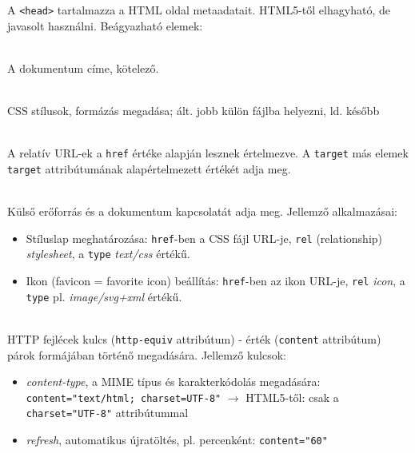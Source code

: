 \begin{frame}
  A \texttt{<head>} tartalmazza a HTML oldal metaadatait. HTML5-től elhagyható, de javasolt használni. Beágyazható elemek:
  \begin{description}[m]
    \item[\texttt{<title>}] \hfill \\ A dokumentum címe, kötelező.
    \item[\texttt{<style>}] \hfill \\ CSS stílusok, formázás megadása; ált. jobb külön fájlba helyezni, ld. később 
    \item[\texttt{<base>}] \hfill \\ A relatív URL-ek a \texttt{href} értéke alapján lesznek értelmezve. A \texttt{target} más elemek \texttt{target} attribútumának alapértelmezett értékét adja meg.
  \end{description}
\end{frame}

\begin{frame}
  \begin{description}[m]
    \item[\texttt{<link>}] \hfill \\ Külső erőforrás és a dokumentum kapcsolatát adja meg. Jellemző alkalmazásai:
    \begin{itemize}
      \item Stíluslap meghatározása: \texttt{href}-ben a CSS fájl URL-je, \texttt{rel} (relationship) \emph{stylesheet}, a \texttt{type} \emph{text/css} értékű.
      \item Ikon (favicon = favorite icon) beállítás: \texttt{href}-ben az ikon URL-je, \texttt{rel} \emph{icon}, a \texttt{type} pl. \emph{image/svg+xml} értékű.
    \end{itemize}
    \item[\texttt{<meta>}] \hfill \\ HTTP fejlécek kulcs (\texttt{http-equiv} attribútum) - érték (\texttt{content} attribútum) párok formájában történő megadására. Jellemző kulcsok:
    \begin{itemize}
      \item \emph{content-type}, a MIME típus és karakterkódolás megadására: \texttt{content="text/html; charset=UTF-8"} $\to$ HTML5-től: csak a \texttt{charset="UTF-8"} attribútummal
      \item \emph{refresh}, automatikus újratöltés, pl. percenként: \texttt{content="60"}
    \end{itemize}
  \end{description}
\end{frame}

